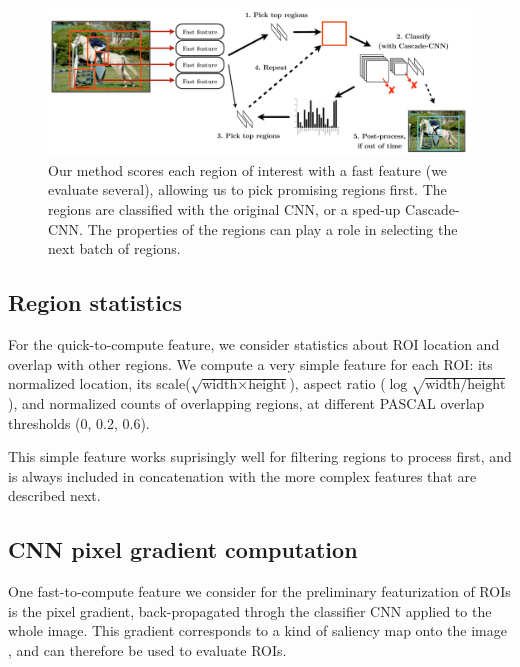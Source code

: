 \begin{figure}[h!]
\begin{center}
\includegraphics[width=0.98\columnwidth]{figures/combined.pdf}
\caption{
Our method scores each region of interest with a fast feature (we evaluate several), allowing us to pick promising regions first.
The regions are classified with the original CNN, or a sped-up Cascade-CNN.
The properties of the regions can play a role in selecting the next batch of regions.
}\label{fig:combined}
\end{center}
\end{figure}

\subsection{Region statistics}\label{sec:region}
For the quick-to-compute feature, we consider statistics about ROI location and overlap with other regions.
We compute a very simple feature for each ROI: its normalized location,
its scale($\sqrt{\text{width} \times \text{height}}$),
aspect ratio ($\log \sqrt{\text{width} / \text{height}}$),
and normalized counts of overlapping regions, at different PASCAL overlap  thresholds (0, 0.2, 0.6).

This simple feature works suprisingly well for filtering regions to process first, and is always included in concatenation with the more complex features that are described next.

\subsection{CNN pixel gradient computation}\label{sec:gradient}

One fast-to-compute feature we consider for the preliminary featurization of ROIs is the pixel gradient, back-propagated throgh the classifier CNN applied to the whole image.
This gradient corresponds to a kind of saliency map onto the image \cite{Simonyan-ICLR-2014}, and can therefore be used to evaluate ROIs.

